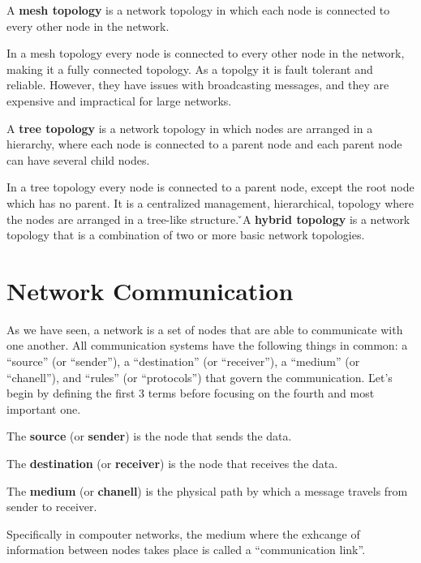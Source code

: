 A \textbf{mesh topology} is a network topology in which each node is connected to every other node in the network.
\ed

In a mesh topology every node is connected to every other node in the network, making it a fully connected topology.
As a topolgy it is fault tolerant and reliable. However, they have issues with broadcasting messages, and they are
expensive and impractical for large networks.

A \textbf{tree topology} is a network topology in which nodes are arranged in a hierarchy, where each node is
connected to a parent node and each parent node can have several child nodes.
\ed

In a tree topology every node is connected to a parent node, except the root node which has no parent. It is a
centralized management, hierarchical, topology where the nodes are arranged in a tree-like structure. \v

A \textbf{hybrid topology} is a network topology that is a combination of two or more basic network topologies.
\ed


\section{Network Communication}

As we have seen, a network is a set of nodes that are able to communicate with one another. All communication systems
have the following things in common: a ``source'' (or ``sender''), a ``destination'' (or ``receiver''), a ``medium''
(or ``chanell''), and ``rules'' (or ``protocols'') that govern the communication. \v

Let's begin by defining the first 3 terms before focusing on the fourth and most important one.

\bd[Source]
The \textbf{source} (or \textbf{sender}) is the node that sends the data.
\ed

\bd[Destination]
The \textbf{destination} (or \textbf{receiver}) is the node that receives the data.
\ed

\bd[Medium]
The \textbf{medium} (or \textbf{chanell}) is the physical path by which a message travels from sender to receiver.
\ed

Specifically in compouter networks, the medium where the exhcange of information between nodes takes place is called a
``communication link''.

